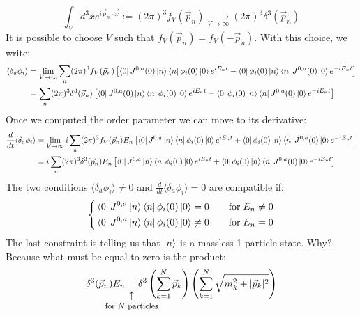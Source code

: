 \documentclass[../main.tex]{subfiles}
\begin{document}
\[
\int_Vd^3xe^{i\Vec{p}_n\cdot\Vec{x}}:=(2\pi)^3f_V(\Vec{p}_n)\xrightarrow[V\to\infty]{}(2\pi)^3\delta^3(\Vec{p}_n)
\]
It is possible to choose $V$ such that $f_V(\Vec{p}_n)=f_V(-\Vec{p}_n)$. With this choice, we write:
\begin{align*}
\langle\delta_a\phi_i\rangle&=\lim_{V\to\infty}\sum_n(2\pi)^3f_V(\Vec{p}_n)\left[\bra{0}J^{0,a}(0)\ket{n}\bra{n}\phi_i(0)\ket{0}e^{iE_nt}-\bra{0}\phi_i(0)\ket{n}\bra{n}J^{0,a}(0)\ket{0}e^{-iE_nt}\right]\\
&=\sum_n(2\pi)^3\delta^3(\Vec{p}_n)\left[\bra{0}J^{0,a}(0)\ket{n}\bra{n}\phi_i(0)\ket{0}e^{iE_nt}-\bra{0}\phi_i(0)\ket{n}\bra{n}J^{0,a}(0)\ket{0}e^{-iE_nt}\right]
\end{align*}
Once we computed the order parameter we can move to its derivative:
\begin{align*}
\frac{d}{dt}\langle\delta_a\phi_i\rangle&=\lim_{V\to\infty}i\sum_n(2\pi)^3f_V(\Vec{p}_n)E_n\left[\bra{0}J^{0,a}\ket{n}\bra{n}\phi_i(0)\ket{0}e^{iE_nt}+\bra{0}\phi_i(0)\ket{n}\bra{n}J^{0,a}(0)\ket{0}e^{-iE_nt}\right]\\
&=i\sum_n(2\pi)^3\delta^3(\Vec{p}_n)E_n\left[\bra{0}J^{0,a}\ket{n}\bra{n}\phi_i(0)\ket{0}e^{iE_nt}+\bra{0}\phi_i(0)\ket{n}\bra{n}J^{0,a}(0)\ket{0}e^{-iE_nt}\right]
\end{align*}
The two conditions $\langle\delta_a\phi_i\rangle\neq0$ and $\frac{d}{dt}\langle\delta_a\phi_i\rangle=0$ are compatible if:
\[
\left\{
\begin{aligned}
&\bra{0}J^{0,a}\ket{n}\bra{n}\phi_i(0)\ket{0}=0\quad &&\text{for}\;E_n\neq0\\
&\bra{0}J^{0,a}\ket{n}\bra{n}\phi_i(0)\ket{0}\neq0\quad &&\text{for}\;E_n=0
\end{aligned}
\right.
\]
The last constraint is telling us that $\ket{n}$ is a massless 1-particle state. Why? Because what must be equal to zero is the product:
\[
\delta^3(\Vec{p}_n)E_n\underset{\mathclap{\tikz \node {$\uparrow$} node [below=1ex] {\footnotesize for $N$ particles };}}{=}\delta^3\left(\sum_{k=1}^N\Vec{p}_k\right)\left(\sum_{k=1}^N\sqrt{m_k^2+|\Vec{p}_k|^2}\right)
\]
\end{document}
